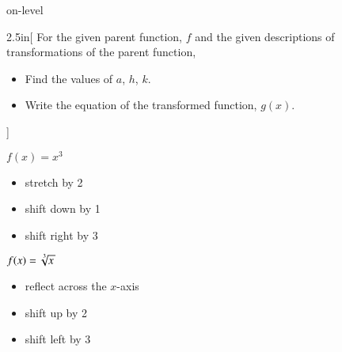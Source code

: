 \begin{taggedblock}{on-level}
    \begin{my2Problems}[\large]{2.5in}[%
        For the given parent function, $f$ 
        and the given descriptions of transformations of the parent function,
        \vspace{-1em}
        \begin{itemize}[nosep]
            \item Find the values of $a$, $h$, $k$. 
            \item Write the equation of the transformed function, $g(x)$.
        \end{itemize}
            ]
        {
            $f(x) = x^3$
            \normalsize
            \begin{itemize}[nosep]
                \item stretch by 2
                \item shift down by 1
                \item shift right by 3
            \end{itemize}
        }
        {
            $f(x) = \myRoot[3]{x}$
            \normalsize
            \begin{itemize}[nosep]
                \item reflect across the $x$-axis
                \item shift up by 2
                \item shift left by 3
            \end{itemize}
        }
    \end{my2Problems}
\end{taggedblock}





